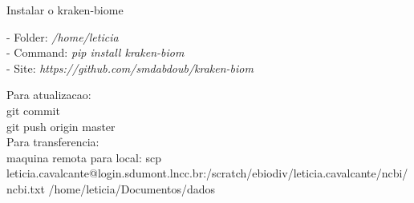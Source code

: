 \documentclass[12pt, a4paper]{report}
\begin{document}
Instalar o kraken-biome

\begin{tcolorbox}[width=6.5in]
- Folder: \textit{/home/leticia}\\
- Command: \textit{pip install kraken-biom}\\
- Site: \textit{https://github.com/smdabdoub/kraken-biom}
\end{tcolorbox}

Para atualizacao: \\
git commit \\
git push origin master \\

Para transferencia: \\
maquina remota para local:
scp leticia.cavalcante@login.sdumont.lncc.br:/scratch/ebiodiv/leticia.cavalcante/ncbi/ncbi.txt /home/leticia/Documentos/dados

 
 



 
\end{document}
